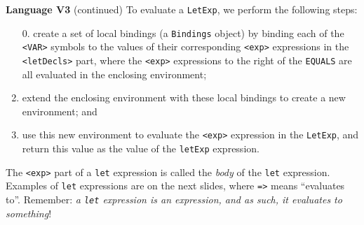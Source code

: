 \begin{minipage}[t]{\sw}
\slidenumber
\LARGE
{\bf Language V3} (continued)\exx
\Large
\emm{}\exx
\LARGE
To evaluate a \verb'LetExp', we perform the following steps:
\begin{enumerate}
\item[0.]
  create a set of local bindings (a \verb'Bindings' object)
  by binding each of the \verb'<VAR>' symbols
  to the values of their corresponding \verb'<exp>' expressions
  in the \verb'<letDecls>' part,
  where the \verb'<exp>' expressions to the right
  of the \verb'EQUALS' are all evaluated
  in the enclosing environment;
\item
  extend the enclosing environment with these local bindings
  to create a new environment; and
\item
  use this new environment to evaluate the \verb'<exp>' expression
  in the \verb'LetExp', and return this value
  as the value of the \verb'letExp' expression.
\end{enumerate}
The \verb'<exp>' part of a \verb'let' expression
is called the {\em body} of the \verb'let' expression.\exx
Examples of \verb'let' expressions are on the next slides,
where \verb'=>' means ``evaluates to''.
Remember: {\em a \verb'let' expression is an expression,
and as such, it evaluates to something}!
\end{minipage}
\clearpage
